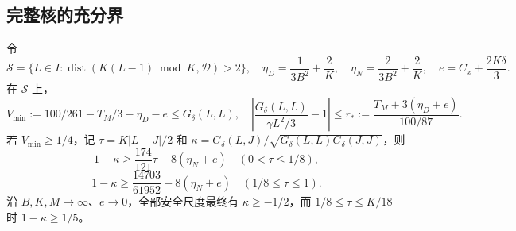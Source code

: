 \subsection{完整核的充分界}
\begin{lemma}[连续安全尺度上的核]\label{lem:paperkernel}
令
\[
 \mathcal S=\{L\in I:\operatorname{dist}(K(L-1)\bmod K,\mathcal D)>2\},
 \quad\eta_D=\frac1{3B^2}+\frac2K,\quad\eta_N=\frac2{3B^2}+\frac2K,
 \quad e=C_x+\frac{2K\delta}{3}.
\]
在 $\mathcal S$ 上，
\[
 V_{\min}:=100/261-T_M/3-\eta_D-e\le G_\delta(L,L),
 \quad\left|\frac{G_\delta(L,L)}{\gamma L^2/3}-1\right|
 \le r_*:=\frac{T_M+3(\eta_D+e)}{100/87}.
\]
若 $V_{\min}\ge1/4$，记 $\tau=K|L-J|/2$ 和
$\kappa=G_\delta(L,J)/\sqrt{G_\delta(L,L)G_\delta(J,J)}$，则
\[
 1-\kappa\ge\frac{174}{121}\tau-8(\eta_N+e)\quad(0<\tau\le1/8),
\]
\[
 1-\kappa\ge\frac{14703}{61952}-8(\eta_N+e)\quad(1/8\le\tau\le1).
\]
沿 $B,K,M\to\infty$、$e\to0$，全部安全尺度最终有
$\kappa\ge-1/2$，而 $1/8\le\tau\le K/18$ 时 $1-\kappa\ge1/5$。
\end{lemma}
